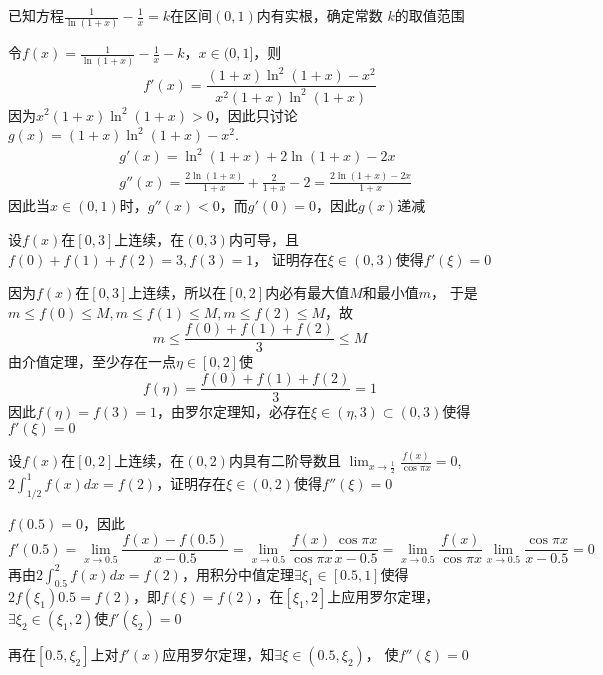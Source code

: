 \documentclass{article}
\begin{document}
\begin{examplle}[]
已知方程\(\frac{1}{\ln(1+x)}-\frac{1}{x}=k\)在区间\((0,1)\)内有实根，确定常数
\(k\)的取值范围

令\(f(x)=\frac{1}{\ln(1+x)}-\frac{1}{x}-k\)，\(x\in(0,1]\)，则
\begin{equation*}
f'(x)=\frac{(1+x)\ln^2(1+x)-x^2}{x^2(1+x)\ln^2(1+x)}
\end{equation*}
因为\(x^2(1+x)\ln^2(1+x)>0\)，因此只讨论\(g(x)=(1+x)\ln^2(1+x)-x^2\).
\begin{align*}
&g'(x)=\ln^2(1+x)+2\ln(1+x)-2x\\
&g''(x)=\frac{2\ln(1+x)}{1+x}+\frac{2}{1+x}-2=\frac{2\ln(1+x)-2x}{1+x}
\end{align*}
因此当\(x\in(0,1)\)时，\(g''(x)<0\)，而\(g'(0)=0\)，因此\(g(x)\)递减
\end{examplle}

\begin{examplle}[]
设\(f(x)\)在\([0,3]\)上连续，在\((0,3)\)内可导，且\(f(0)+f(1)+f(2)=3,f(3)=1\)，
证明存在\(\xi\in(0,3)\)使得\(f'(\xi)=0\)

因为\(f(x)\)在\([0,3]\)上连续，所以在\([0,2]\)内必有最大值\(M\)和最小值\(m\)，
于是\(m\le f(0)\le M,m\le f(1)\le M,m\le f(2)\le M\)，故
\begin{equation*}
m\le\frac{f(0)+f(1)+f(2)}{3}\le M
\end{equation*}
由介值定理，至少存在一点\(\eta\in[0,2]\)使
\begin{equation*}
f(\eta)=\frac{f(0)+f(1)+f(2)}{3}=1
\end{equation*}
因此\(f(\eta)=f(3)=1\)，由罗尔定理知，必存在\(\xi\in(\eta,3)\subset(0,3)\)使得\(f'(\xi)=0\)
\end{examplle}

\begin{examplle}[]
设\(f(x)\)在\([0,2]\)上连续，在\((0,2)\)内具有二阶导数且
\(\displaystyle\lim_{x\to\frac{1}{2}}\frac{f(x)}{\cos\pi x}=0\),
\(2\int_{1/2}^1f(x)dx=f(2)\)，证明存在\(\xi\in(0,2)\)使得\(f''(\xi)=0\)

\(f(0.5)=0\)，因此
\begin{equation*}
f'(0.5)=\lim_{x\to0.5}\frac{f(x)-f(0.5)}{x-0.5}=
\lim_{x\to0.5}\frac{f(x)}{\cos\pi x}\frac{\cos\pi x}{x-0.5}=
\lim_{x\to0.5}\frac{f(x)}{\cos\pi x}\lim_{x\to0.5}\frac{\cos\pi x}{x-0.5}=0
\end{equation*}
再由\(2\int_{0.5}^2f(x)dx=f(2)\)，用积分中值定理\(\exists\xi_1\in[0.5,1]\)使得
\(2f(\xi_1)0.5=f(2)\)，即\(f(\xi)=f(2)\)，在\([\xi_1,2]\)上应用罗尔定理，
\(\exists\xi_2\in(\xi_1,2)\)使\(f'(\xi_2)=0\)

再在\([0.5,\xi_2]\)上对\(f'(x)\)应用罗尔定理，知\(\exists\xi\in(0.5,\xi_2)\)，
使\(f''(\xi)=0\)
\end{examplle}
\end{document}
